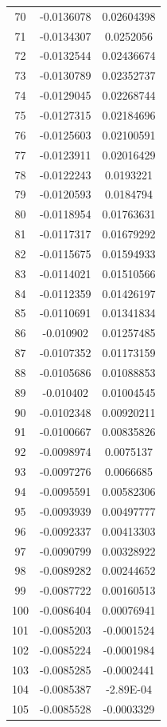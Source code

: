 \documentclass[a4paper, 11pt, oneside]{report}
\begin{document}
{\begin{longtable}{|c|c|c|}
70  & -0.0136078 & 0.02604398 \\
71  & -0.0134307 & 0.0252056  \\
72  & -0.0132544 & 0.02436674 \\
73  & -0.0130789 & 0.02352737 \\
74  & -0.0129045 & 0.02268744 \\
75  & -0.0127315 & 0.02184696 \\
76  & -0.0125603 & 0.02100591 \\
77  & -0.0123911 & 0.02016429 \\
78  & -0.0122243 & 0.0193221  \\
79  & -0.0120593 & 0.0184794  \\
80  & -0.0118954 & 0.01763631 \\
81  & -0.0117317 & 0.01679292 \\
82  & -0.0115675 & 0.01594933 \\
83  & -0.0114021 & 0.01510566 \\
84  & -0.0112359 & 0.01426197 \\
85  & -0.0110691 & 0.01341834 \\
86  & -0.010902  & 0.01257485 \\
87  & -0.0107352 & 0.01173159 \\
88  & -0.0105686 & 0.01088853 \\
89  & -0.010402  & 0.01004545 \\
90  & -0.0102348 & 0.00920211 \\
91  & -0.0100667 & 0.00835826 \\
92  & -0.0098974 & 0.0075137  \\
93  & -0.0097276 & 0.0066685  \\
94  & -0.0095591 & 0.00582306 \\
95  & -0.0093939 & 0.00497777 \\
96  & -0.0092337 & 0.00413303 \\
97  & -0.0090799 & 0.00328922 \\
98  & -0.0089282 & 0.00244652 \\
99  & -0.0087722 & 0.00160513 \\
100 & -0.0086404 & 0.00076941 \\
101 & -0.0085203 & -0.0001524 \\
102 & -0.0085224 & -0.0001984 \\
103 & -0.0085285 & -0.0002441 \\
104 & -0.0085387 & -2.89E-04  \\
105 & -0.0085528 & -0.0003329 \\

\end{longtable}}
\end{document}
